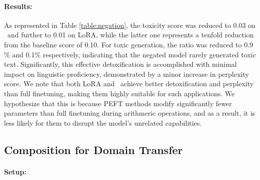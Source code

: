 \paragraph{Results:}
As represented in Table \ref{table:negation}, the toxicity score was reduced to 0.03 on \ia~and further to 0.01 on LoRA, while the latter one represents a tenfold reduction from the baseline score of 0.10.
For toxic generation, the ratio was reduced to 0.9$\%$ and 0.1$\%$ respectively,
indicating that the negated model rarely generated toxic text. 
Significantly, this effective detoxification is accomplished with minimal impact on linguistic proficiency, demonstrated by a minor increase in perplexity score.
We note that both LoRA and \ia~achieve better detoxification and perplexity than full finetuning, making them highly suitable for such applications.
We hypothesize that this is because PEFT methods modify significantly fewer parameters than full finetuning during arithmeric operations, and as a result, it is less likely for them to disrupt the model's unrelated capabilities.



\subsection{Composition for Domain Transfer}
\label{sec:combine}
\paragraph{Setup:}

